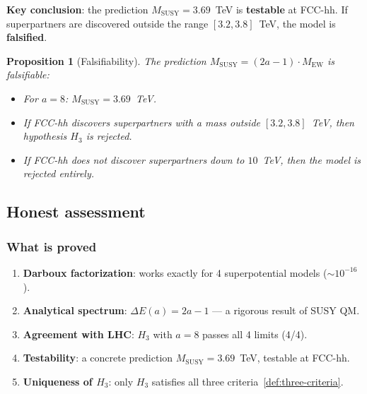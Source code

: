 \documentclass[11pt,a4paper]{article}
\newtheorem{proposition}[theorem]{Proposition}
\theoremstyle{definition}
\begin{document}
\medskip\noindent
\textbf{Key conclusion}: the prediction $M_{\text{SUSY}} = 3.69$~TeV
is \textbf{testable} at FCC-hh. If superpartners are
discovered outside the range $[3.2, 3.8]$~TeV, the model
is \textbf{falsified}.

\begin{proposition}[Falsifiability]
\label{prop:falsifiability}
The prediction $M_{\text{SUSY}} = (2a-1) \cdot M_{\text{EW}}$
is \emph{falsifiable}:
\begin{itemize}
    \item For $a = 8$: $M_{\text{SUSY}} = 3.69$~TeV.
    \item If FCC-hh discovers superpartners with a mass
          outside $[3.2, 3.8]$~TeV, then hypothesis $H_3$
          is rejected.
    \item If FCC-hh does not discover superpartners down to $10$~TeV,
          then the model is rejected entirely.
\end{itemize}
\end{proposition}

\subsection{Honest assessment}
\label{subsec:susy-honest}

\subsubsection{What is proved}

\begin{enumerate}
    \item \textbf{Darboux factorization}: works exactly
          for 4 superpotential models ($\sim 10^{-16}$).
    \item \textbf{Analytical spectrum}: $\Delta E(a) = 2a - 1$
          --- a rigorous result of SUSY QM.
    \item \textbf{Agreement with LHC}: $H_3$ with $a = 8$ passes
          all 4 limits (4/4).
    \item \textbf{Testability}: a concrete prediction
          $M_{\text{SUSY}} = 3.69$~TeV, testable at FCC-hh.
    \item \textbf{Uniqueness of $H_3$}: only $H_3$
          satisfies all three criteria~\ref{def:three-criteria}.
\end{enumerate}
\end{document}
